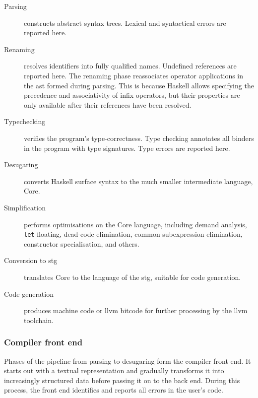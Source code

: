 \documentclass[thesis=B,english]{FITthesis}[2019/12/23]
\newcommand{\hsCode}[1]{\texttt{#1}}
\begin{document}
\begin{description}
	\item[Parsing] constructs abstract syntax trees. Lexical and syntactical
		errors are reported here.
	\item[Renaming] resolves identifiers into fully qualified names. Undefined
		references are reported here. The renaming phase re\-associates
		operator applications in the \acrshort{ast} formed during parsing. This
		is because Haskell allows specifying the precedence and associativity
		of infix operators, but their properties are only available after their
		references have been resolved.
	\item[Typechecking] verifies the program's type-correctness. Type checking
		annotates all binders in the program with type signatures.  Type errors
		are reported here.
	\item[Desugaring] converts Haskell surface syntax to the much smaller
		intermediate language, Core.
	\item[Simplification] performs optimisations on the Core language,
		including demand analysis, \hsCode{let} floating, dead-code
		elimination, common subexpression elimination, constructor
		specialisation, and others.
	\item[Conversion to \acrshort{stg}] translates Core to the language of the
		\acrlong{stg}, suitable for code generation.
	\item[Code generation] produces machine code or \acrshort{llvm} bitcode
		for further processing by the \acrshort{llvm} toolchain.
\end{description}

\subsubsection*{Compiler front end}
Phases of the pipeline from parsing to desugaring form the compiler front end.
It starts out with a textual representation and gradually transforms it into
increasingly structured data before passing it on to the back end. During this
process, the front end identifies and reports all errors in the user's code.
\end{document}
